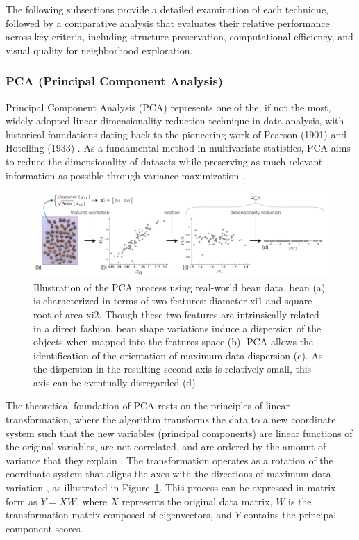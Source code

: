 The following subsections provide a detailed examination of each technique, followed by a comparative analysis that evaluates their relative performance across key criteria, including structure preservation, computational efficiency, and visual quality for neighborhood exploration. 

\subsubsection{PCA (Principal Component Analysis)}

Principal Component Analysis (PCA) represents one of the, if not the most, widely adopted linear dimensionality reduction technique in data analysis, with historical foundations dating back to the pioneering work of Pearson (1901) and Hotelling (1933) \cite{sewell2008pca}. As a fundamental method in multivariate statistics, PCA aims to reduce the dimensionality of datasets while preserving as much relevant information as possible through variance maximization \cite{sewell2008pca}.

\begin{figure}[htbp]
    \centering
    \includegraphics[width=1.0\textwidth]{images/PCA1.png}
    \caption{Illustration of the PCA process using real-world bean data. bean (a) is characterized in terms of two features: diameter xi1 and square root of area xi2. Though these two features are intrinsically related in a direct fashion,
bean shape variations induce a dispersion of the objects when mapped into the features space (b). PCA allows the identification of the orientation of maximum data dispersion (c). As the dispersion in the resulting
second axis is relatively small, this axis can be eventually disregarded (d).}
    \label{fig:pca_process}
\end{figure}

The theoretical foundation of PCA rests on the principles of linear transformation, where the algorithm transforms the data to a new coordinate system such that the new variables (principal components) are linear functions of the original variables, are not correlated, and are ordered by the amount of variance that they explain \cite{sewell2008pca}. The transformation operates as a rotation of the coordinate system that aligns the axes with the directions of maximum data variation \cite{gewers2021pca}, as illustrated in Figure~\ref{fig:pca_process}. This process can be expressed in matrix form as $Y = XW$, where $X$ represents the original data matrix, $W$ is the transformation matrix composed of eigenvectors, and $Y$ contains the principal component scores.

